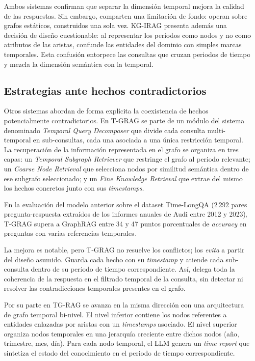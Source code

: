 Ambos sistemas confirman que separar la dimensión temporal mejora la calidad de las respuestas. Sin embargo, comparten una limitación de fondo: operan sobre grafos estáticos, construidos una sola vez. KG-IRAG presenta además una decisión de diseño cuestionable: al representar los periodos como nodos y no como atributos de las aristas, confunde las entidades del dominio con simples marcas temporales. Esta confusión entorpece las consultas que cruzan periodos de tiempo y mezcla la dimensión semántica con la temporal.

\subsection{Estrategias ante hechos contradictorios}

Otros sistemas abordan de forma explícita la coexistencia de hechos potencialmente contradictorios. En T-GRAG \cite{tgrag2025} se parte de un módulo del sistema denominado \emph{Temporal Query Decomposer} que divide cada consulta multi-temporal en sub-consultas, cada una asociada a una única restricción temporal. La recuperación de la información representada en el grafo se organiza en tres capas: un \emph{Temporal Subgraph Retriever} que restringe el grafo al periodo relevante; un \emph{Coarse Node Retrieval} que selecciona nodos por similitud semántica dentro de ese subgrafo seleccionado; y un \emph{Fine Knowledge Retrieval} que extrae del mismo los hechos concretos junto con sus \emph{timestamps}.


En la evaluación del modelo anterior sobre el dataset Time-LongQA (2\,292 pares pregunta-respuesta extraídos de los informes anuales de Audi entre 2012 y 2023), T-GRAG supera a GraphRAG entre 34 y 47 puntos porcentuales de \emph{accuracy} en preguntas con varias referencias temporales.

La mejora es notable, pero T-GRAG no resuelve los conflictos; los \emph{evita} a partir del diseño asumido. Guarda cada hecho con su \emph{timestamp} y atiende cada sub-consulta dentro de su periodo de tiempo correspondiente. Así, delega toda la coherencia de la respuesta en el filtrado temporal de la consulta, sin detectar ni resolver las contradicciones temporales presentes en el grafo.

Por su parte en TG-RAG \cite{tg_rag2025} se avanza en la misma dirección con una arquitectura de grafo temporal bi-nivel. El nivel inferior contiene los nodos referentes a entidades enlazadas por aristas con un \emph{timestamps} asociado. El nivel superior organiza nodos temporales en una jerarquía creciente entre dichos nodos (año, trimestre, mes, día). Para cada nodo temporal, el LLM genera un \emph{time report} que sintetiza el estado del conocimiento en el periodo de tiempo correspondiente.

